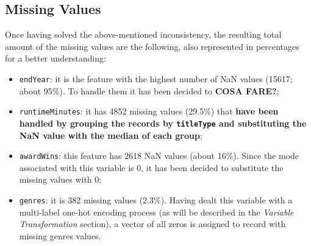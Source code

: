 \subsection{Missing Values}
Once having solved the above-mentioned inconsistency, the resulting total amount of the missing values are the following, also represented in percentages for a better understanding:
\begin{itemize}
    \item \texttt{endYear}: it is the feature with the highest number of NaN values (15617; about 95\%). To handle them it has been decided to \textbf{COSA FARE?};
    
    \item \texttt{runtimeMinutes}: it has 4852 missing values (29.5\%) that \textbf{have been handled by grouping the records by \texttt{titleType} and substituting the NaN value with the median of each group};
    
    \item \texttt{awardWins}: this feature has 2618 NaN values (about 16\%). Since the mode associated with this variable is 0, it has been decided to substitute the missing values with 0;

    \item \texttt{genres}: it is 382 missing values (2.3\%). Having dealt this variable with a multi-label one-hot encoding process (as will be described in the \textit{Variable Transformation} section), a vector of all zeros is assigned to record with missing genres values.
\end{itemize}




